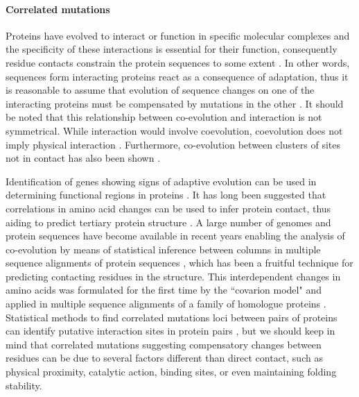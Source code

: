 \paragraph{Correlated mutations}
Proteins have evolved to interact or function in specific molecular complexes and the specificity of these interactions is essential for their function, consequently residue contacts constrain the protein sequences to some extent \cite{pazos1997correlated}.
In other words, sequences form interacting proteins react as a consequence of adaptation, thus it is reasonable to assume that evolution of sequence changes on one of the interacting proteins must be compensated by mutations in the other \cite{pazos1997correlated}.
It should be noted that this relationship between co-evolution and interaction is not symmetrical. 
While interaction would involve coevolution, coevolution does not imply physical interaction \cite{fares2006novel}.
Furthermore, co-evolution between clusters of sites not in contact has also been shown \cite{fares2006novel:REF(Pritchard and Dufton 2000)}.

Identification of genes showing signs of adaptive evolution can be used in determining functional regions in proteins \cite{fares2006novel}.
It has long been suggested that correlations in amino acid changes can be used to infer protein contact, thus aiding to predict tertiary protein structure \cite{fitch1970improved, morcos2011direct, burger2010disentangling, de2013emerging}.
A large number of genomes and protein sequences have become available in recent years enabling the analysis of co-evolution by means of statistical inference between columns in multiple sequence alignments of protein sequences \cite{burger2010disentangling, burger2010disentangling}, which has been a fruitful technique for predicting contacting residues in the structure.
This interdependent changes in amino acids was formulated for the first time by the ``covarion model" \cite{fitch1970improved} and applied in multiple sequence alignments of a family of homologue proteins \cite{de2013emerging}.
Statistical methods to find correlated mutations loci between pairs of proteins can identify putative interaction sites in protein pairs \cite{de2013emerging}, but we should keep in mind that correlated mutations suggesting compensatory changes between residues can be due to several factors different than direct contact, such as physical proximity, catalytic action, binding sites, or even maintaining folding stability.

